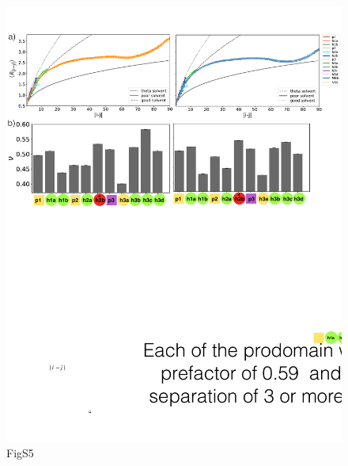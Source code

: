 \documentclass[10pt,letterpaper]{article}
\begin{document}
\begin{figure}[!ht]
\includegraphics[scale=0.5,width=\textwidth,trim={0 0cm 0 0cm},clip]{./figures/S5.pdf}
\caption{{FigS5}}
\end{figure}
\end{document}
